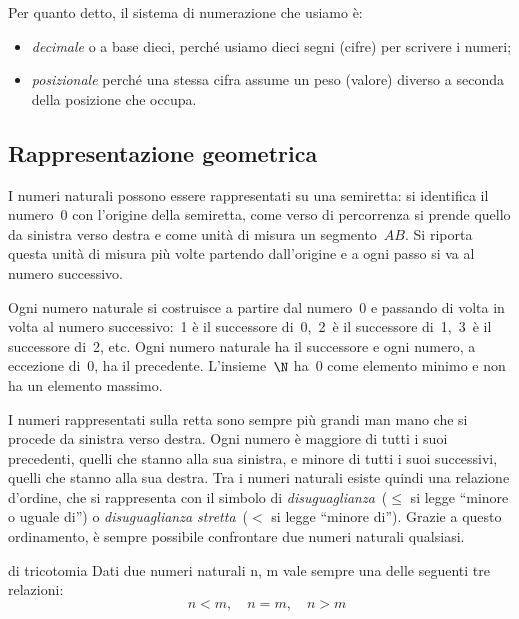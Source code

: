 \bigskip
Per quanto detto, il sistema di numerazione che usiamo è:

\begin{itemize} [noitemsep]
 \item \emph{decimale} o a base dieci, 
  perché usiamo dieci segni (cifre) per scrivere i numeri;
 \item \emph{posizionale} 
  perché una stessa cifra assume un peso (valore) diverso a seconda della 
  posizione che occupa.
\end{itemize}

\subsection{Rappresentazione geometrica}
I numeri naturali possono essere rappresentati su una semiretta: 
si identifica il numero~0 con l'origine della semiretta, come verso di 
percorrenza si prende quello da sinistra verso destra e come unità di 
misura un segmento~\(AB\). 
Si riporta questa unità di misura più volte partendo dall'origine e a ogni 
passo si va al numero successivo.

\begin{inaccessibleblock}
\begin{center}
 
\end{center}
\end{inaccessibleblock}

Ogni numero naturale si costruisce a partire dal numero~0 e passando di 
volta in volta al numero successivo:~1 è il successore di~0,~2~è il 
successore di~1,~3~è il successore di~2, etc. 
Ogni numero naturale ha il successore e ogni numero, a eccezione di~0, ha il
precedente. 
L'insieme~\(\N\) ha~0 come elemento minimo e non ha un elemento massimo.

I numeri rappresentati sulla retta sono sempre più grandi man mano che si 
procede da sinistra verso destra. 
Ogni numero è maggiore di tutti i suoi precedenti, quelli che stanno alla 
sua sinistra, e minore di tutti i suoi successivi, quelli che stanno alla 
sua destra. 
Tra i numeri naturali esiste quindi una relazione d'ordine, che si 
rappresenta con il simbolo di 
\emph{disuguaglianza}~(\(\le\) si legge ``minore o uguale di'') o 
\emph{disuguaglianza stretta}~(\(<\) si legge ``minore di'').
Grazie a questo ordinamento, è sempre possibile confrontare due numeri 
naturali qualsiasi.

\begin{principio}{di tricotomia}{}
Dati due numeri naturali n, m vale sempre una delle seguenti tre relazioni: 
\[\quad n < m,\quad n = m, \quad n > m\]
\end{principio}

